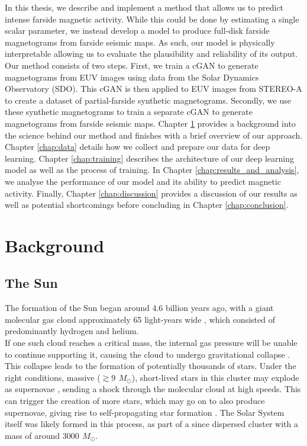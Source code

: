 \documentclass[11pt,a4paper,onecolumn]{report}
\begin{document}
In this thesis, we describe and implement a method that allows us to predict
intense farside magnetic activity. While this could be done by estimating a
single scalar parameter, we instead develop a model to produce full-disk farside
magnetograms from farside seismic maps. As such, our model is physically
interpretable allowing us to evaluate the plausibility and reliability of its
output. Our method consists of two steps. First, we train a cGAN to generate
magnetograms from EUV images using data from the Solar Dynamics Observatory
(SDO). This cGAN is then applied to EUV images from STEREO-A to create a dataset
of partial-farside synthetic magnetograms. Secondly, we use these synthetic
magnetograms to train a separate cGAN to generate magnetograms from farside
seismic maps. Chapter \ref{chap:background} provides a background into the
science behind our method and finishes with a brief overview of our approach.
Chapter \ref{chap:data} details how we collect and prepare our data for deep
learning. Chapter \ref{chap:training} describes the architecture of our deep
learning model as well as the process of training. In Chapter
\ref{chap:results_and_analysis}, we analyse the performance of our model and its
ability to predict magnetic activity. Finally, Chapter \ref{chap:discussion}
provides a discussion of our results as well as potential shortcomings before
concluding in Chapter \ref{chap:conclusion}.

%
%
%
%
%
%
\chapter{Background}
%
%
%
%
%
%
\label{chap:background}


%
%
%
%
%
%

\section{The Sun}
\label{sec:Sun}

The formation of the Sun began around 4.6 billion years ago, with a giant
molecular gas cloud approximately 65 light-years wide
\citep{montmerle_solar_2006}, which consisted of predominantly hydrogen and
helium. \\

If one such cloud reaches a critical mass, the internal gas pressure will be
unable to continue supporting it, causing the cloud to undergo gravitational
collapse \citep{jeans_stability_1902}. This collapse leads to the formation of
potentially thousands of stars. Under the right conditions, massive (\(\gtrsim
\SI{9}{\,M_\odot} \)), short-lived stars in this cluster may explode as
supernovae \citep{heger_how_2003}, sending a shock through the molecular cloud
at high speeds. This can trigger the creation of more stars, which may go on to
also produce supernovae, giving rise to self-propagating star formation
\citep{mueller_propagating_1976}. The Solar System itself was likely formed in
this process, as part of a since dispersed cluster with a mass of around
\(\SI{3000}{\,M_\odot} \)\citep{zwart_lost_2009, williams_astrophysical_2010}. \\
\end{document}
